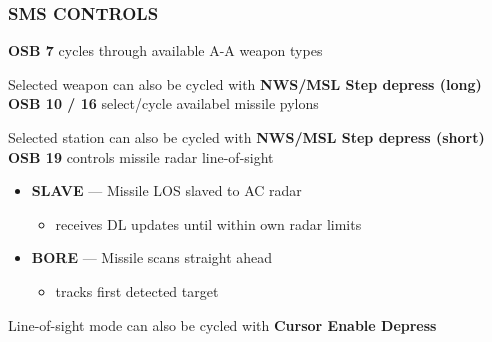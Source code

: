 \subsubsection{SMS CONTROLS}
\label{subsec:aim120:sms}
\begin{tcoloritemize}
    \textbf{OSB 7} cycles through available A-A weapon types
    
    \medskip
    Selected weapon can also be cycled with \textbf{NWS/MSL Step depress (long)}
    \textbf{OSB 10 / 16} select/cycle availabel missile pylons
    
    \medskip
    Selected station can also be cycled with \textbf{NWS/MSL Step depress (short)}
    \textbf{OSB 19} controls missile radar line-of-sight
    \begin{itemize}
        \item \textbf{SLAVE} --- Missile LOS slaved to AC radar 
        \begin{itemize}
            \item receives DL updates until within own radar limits
        \end{itemize}
        \item \textbf{BORE} --- Missile scans straight ahead
        \begin{itemize}
            \item tracks first detected target
        \end{itemize}
    \end{itemize}
    
    Line-of-sight mode can also be cycled with \textbf{Cursor Enable Depress}
\end{tcoloritemize}

